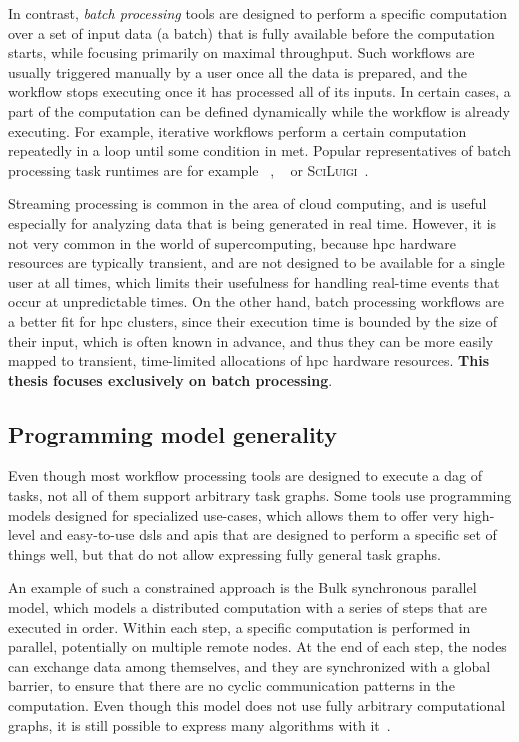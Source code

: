 In contrast, \emph{batch processing} tools are designed to perform a specific computation over a
set of input data (a batch) that is fully available before the computation starts, while focusing
primarily on maximal throughput. Such workflows are usually triggered manually by a user once all
the data is prepared, and the workflow stops executing once it has processed all of its inputs. In
certain cases, a part of the computation can be defined dynamically while the workflow is already
executing. For example, iterative workflows perform a certain computation repeatedly in a loop
until some condition in met. Popular representatives of batch processing task runtimes are for
example \dask{}~\cite{dask},
\snakemake{}~\cite{snakemake} or \textsc{SciLuigi}~\cite{sciluigi}.

Streaming processing is common in the area of cloud computing, and is useful especially for
analyzing data that is being generated in real time. However, it is not very common in the world of
supercomputing, because \gls{hpc} hardware resources are typically transient, and are
not designed to be available for a single user at all times, which limits their usefulness for
handling real-time events that occur at unpredictable times. On the other hand, batch processing
workflows are a better fit for \gls{hpc} clusters, since their execution time is
bounded by the size of their input, which is often known in advance, and thus they can be more
easily mapped to transient, time-limited allocations of \gls{hpc} hardware resources.
\textbf{This thesis focuses exclusively on batch processing}.

\subsection{Programming model generality}
Even though most workflow processing tools are designed to execute a \gls{dag} of
tasks, not all of them support arbitrary task graphs. Some tools use programming models designed
for specialized use-cases, which allows them to offer very high-level and easy-to-use
\glspl{dsl} and \glspl{api} that are designed to perform a specific set of
things well, but that do not allow expressing fully general task graphs.

An example of such a constrained approach is the Bulk synchronous parallel~\cite{bulkparallel1}
model, which models a distributed computation with a series of steps that are executed in order.
Within each step, a specific computation is performed in parallel, potentially on multiple remote
nodes. At the end of each step, the nodes can exchange data among themselves, and they are
synchronized with a global barrier, to ensure that there are no cyclic communication patterns in
the computation. Even though this model does not use fully arbitrary computational graphs, it is
still possible to express many algorithms with it~\cite{bulkparallel2}.

